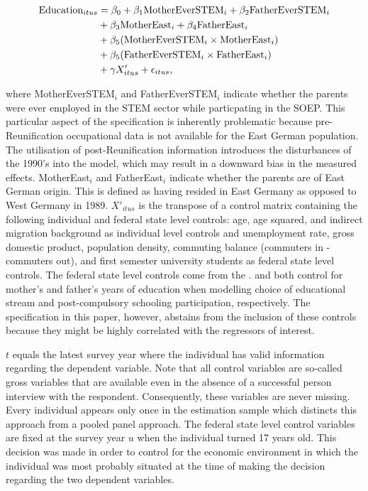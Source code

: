 \documentclass[a4paper, oneside, hyperfootnotes = false]{article}
\begin{document}
{\vspace{-8mm}

\begin{equation}
	\begin{split}
		\label{eq:specification}
		\textnormal{Education}_{itus} &={} \beta_{0} + \beta_{1}\textnormal{MotherEverSTEM}_{i} + \beta_{2}\textnormal{FatherEverSTEM}_{i} \\
		& + \beta_{3}\textnormal{MotherEast}_{i} + \beta_{4}\textnormal{FatherEast}_{i} \\
		& + \beta_{5}(\textnormal{MotherEverSTEM}_{i} \times \textnormal{MotherEast}_{i}) \\
		& + \beta_{5}(\textnormal{FatherEverSTEM}_{i} \times \textnormal{FatherEast}_{i}) \\
		& + \gamma{}X'_{itus} + \epsilon_{itus}\textnormal{,}
	\end{split}
\end{equation}

\noindent where MotherEverSTEM$_{i}$ and FatherEverSTEM$_{i}$ indicate whether the parents were ever employed in the STEM sector while particpating in the SOEP.
This particular aspect of the specification is inherently problematic because pre-Reunification occupational data is not available for the East German population.
The utilisation of post-Reunification information introduces the disturbances of the 1990's into the model, which may result in a downward bias in the measured effects.
MotherEast$_{i}$ and FatherEast$_{i}$ indicate whether the parents are of East German origin.
This is defined as having resided in East Germany as opposed to West Germany in 1989.
$X'_{itus}$ is the transpose of a control matrix containing the following individual and federal state level controls:
age, age squared, and indirect migration background as individual level controls and unemployment rate, gross domestic product, population density, commuting balance (commuters in - commuters out), and first semester university students as federal state level controls.
The federal state level controls come from the \cite{INKAR2024}.
\cite{Sahoo2021} and \cite{Chevalier2013} both control for mother's and father's years of education when modelling choice of educational stream and post-compulsory schooling participation, respectively.
The specification in this paper, however, abstains from the inclusion of these controls because they might be highly correlated with the regressors of interest.

$t$ equals the latest survey year where the individual has valid information regarding the dependent variable.
Note that all control variables are so-called gross variables that are available even in the absence of a successful person interview with the respondent.
Consequently, these variables are never missing.
Every individual appears only once in the estimation sample which distincts this approach from a pooled panel approach.
The federal state level control variables are fixed at the survey year $u$ when the individual turned 17 years old.
This decision was made in order to control for the economic environment in which the individual was most probably situated at the time of making the decision regarding the two dependent variables.

}
\end{document}
